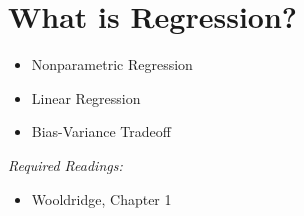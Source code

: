 \documentclass{article}
\begin{document}


\section{What is Regression?}

\begin{itemize}
\item Nonparametric Regression
\item Linear Regression
\item Bias-Variance Tradeoff
\end{itemize}
\textit{Required Readings:} \begin{itemize}
  \item Wooldridge, Chapter 1
\end{itemize}


\end{document}

